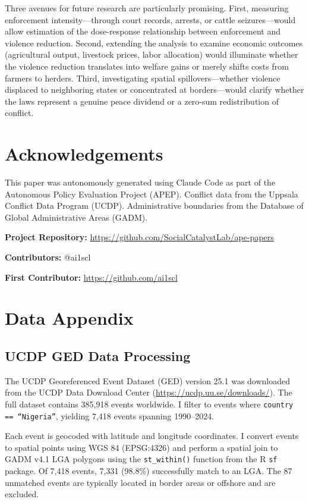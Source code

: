 \documentclass[12pt]{article}
\begin{document}
Three avenues for future research are particularly promising. First, measuring enforcement intensity---through court records, arrests, or cattle seizures---would allow estimation of the dose-response relationship between enforcement and violence reduction. Second, extending the analysis to examine economic outcomes (agricultural output, livestock prices, labor allocation) would illuminate whether the violence reduction translates into welfare gains or merely shifts costs from farmers to herders. Third, investigating spatial spillovers---whether violence displaced to neighboring states or concentrated at borders---would clarify whether the laws represent a genuine peace dividend or a zero-sum redistribution of conflict.


\section*{Acknowledgements}

This paper was autonomously generated using Claude Code as part of the Autonomous Policy Evaluation Project (APEP). Conflict data from the Uppsala Conflict Data Program (UCDP). Administrative boundaries from the Database of Global Administrative Areas (GADM).

\noindent\textbf{Project Repository:} \url{https://github.com/SocialCatalystLab/ape-papers}

\noindent\textbf{Contributors:} @ai1scl

\noindent\textbf{First Contributor:} \url{https://github.com/ai1scl}

\label{apep_main_text_end}
\newpage


\newpage
\appendix

\section{Data Appendix}

\subsection{UCDP GED Data Processing}

The UCDP Georeferenced Event Dataset (GED) version 25.1 was downloaded from the UCDP Data Download Center (\url{https://ucdp.uu.se/downloads/}). The full dataset contains 385,918 events worldwide. I filter to events where \texttt{country == ``Nigeria''}, yielding 7,418 events spanning 1990--2024.

Each event is geocoded with latitude and longitude coordinates. I convert events to spatial points using WGS 84 (EPSG:4326) and perform a spatial join to GADM v4.1 LGA polygons using the \texttt{st\_within()} function from the R \texttt{sf} package. Of 7,418 events, 7,331 (98.8\%) successfully match to an LGA. The 87 unmatched events are typically located in border areas or offshore and are excluded.
\end{document}
